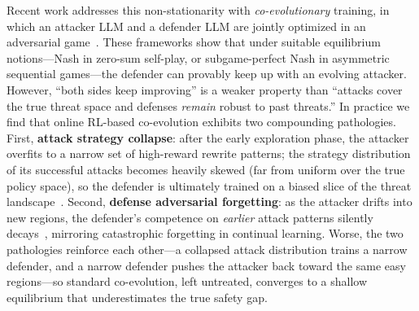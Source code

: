 Recent work addresses this non-stationarity with \emph{co-evolutionary} training, in which an attacker LLM and a defender LLM are jointly optimized in an adversarial game~\citep{liu2025chasing, magic2025, pan2025advevo, ssp2026, triplayrl2026}. These frameworks show that under suitable equilibrium notions---Nash in zero-sum self-play, or subgame-perfect Nash in asymmetric sequential games---the defender can provably keep up with an evolving attacker. However, ``both sides keep improving'' is a weaker property than ``attacks cover the true threat space and defenses \emph{remain} robust to past threats.'' In practice we find that online RL-based co-evolution exhibits two compounding pathologies. First, \textbf{attack strategy collapse}: after the early exploration phase, the attacker overfits to a narrow set of high-reward rewrite patterns; the strategy distribution of its successful attacks becomes heavily skewed (far from uniform over the true policy space), so the defender is ultimately trained on a biased slice of the threat landscape~\citep{samvelyan2024rainbow, hong2024curiosity}. Second, \textbf{defense adversarial forgetting}: as the attacker drifts into new regions, the defender's competence on \emph{earlier} attack patterns silently decays~\citep{ssp2026}, mirroring catastrophic forgetting in continual learning. Worse, the two pathologies reinforce each other---a collapsed attack distribution trains a narrow defender, and a narrow defender pushes the attacker back toward the same easy regions---so standard co-evolution, left untreated, converges to a shallow equilibrium that underestimates the true safety gap.


